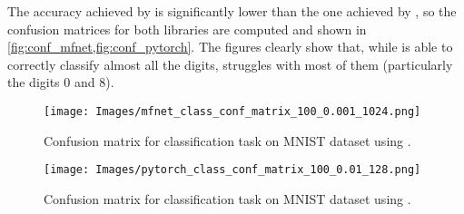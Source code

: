 The accuracy achieved by \pytorch is significantly lower than the one achieved by \mfnet, so the confusion matrices for both libraries are computed and shown in \cref{fig:conf_mfnet,fig:conf_pytorch}. The figures clearly show that, while \mfnet is able to correctly classify almost all the digits, \pytorch struggles with most of them (particularly the digits 0 and 8).

\begin{figure}[ht]
    \centering
    \texttt{[image: Images/mfnet\_class\_conf\_matrix\_100\_0.001\_1024.png]}
    \caption{Confusion matrix for classification task on MNIST dataset using \mfnet.}
    \label{fig:conf_mfnet}
\end{figure}

\begin{figure}[ht]
    \centering
    \texttt{[image: Images/pytorch\_class\_conf\_matrix\_100\_0.01\_128.png]}
    \caption{Confusion matrix for classification task on MNIST dataset using \pytorch.}
    \label{fig:conf_pytorch}
\end{figure}
